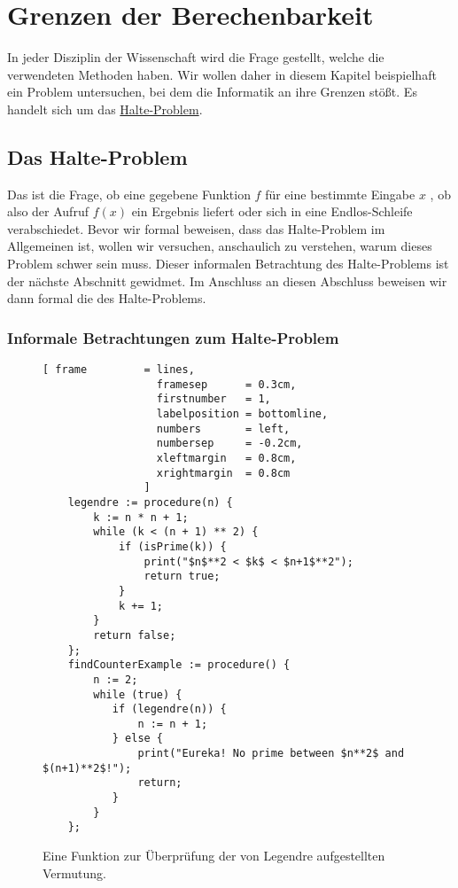 \chapter{Grenzen der Berechenbarkeit}
In jeder Disziplin der Wissenschaft wird die Frage gestellt, welche  die
verwendeten Methoden haben.   Wir wollen daher in diesem Kapitel beispielhaft ein Problem
untersuchen, bei dem die Informatik an ihre Grenzen stößt.  Es handelt sich um das
\href{http://de.wikipedia.org/wiki/Halteproblem}{Halte-Problem}.  

\section{Das Halte-Problem}
Das  ist die Frage, ob eine gegebene Funktion $f$ für eine bestimmte Eingabe $x$ 
, ob also der Aufruf $f(x)$ ein Ergebnis liefert oder sich in eine Endlos-Schleife
verabschiedet.   Bevor wir formal beweisen, dass das Halte-Problem im Allgemeinen  ist, wollen 
wir versuchen, anschaulich zu verstehen, warum dieses Problem schwer sein muss.  Dieser informalen
Betrachtung des Halte-Problems ist der nächste Abschnitt gewidmet.  Im Anschluss an diesen Abschluss
beweisen wir dann formal die  des Halte-Problems. 

\subsection{Informale Betrachtungen zum Halte-Problem}


\begin{figure}[!ht]
\centering
\begin{Verbatim}[ frame         = lines, 
                  framesep      = 0.3cm, 
                  firstnumber   = 1,
                  labelposition = bottomline,
                  numbers       = left,
                  numbersep     = -0.2cm,
                  xleftmargin   = 0.8cm,
                  xrightmargin  = 0.8cm
                ]
    legendre := procedure(n) {
        k := n * n + 1;
        while (k < (n + 1) ** 2) {
            if (isPrime(k)) {
                print("$n$**2 < $k$ < $n+1$**2");
                return true;
            }
            k += 1;
        }
        return false;
    };
    findCounterExample := procedure() {
        n := 2;
        while (true) {
           if (legendre(n)) {
               n := n + 1;
           } else {
               print("Eureka! No prime between $n**2$ and $(n+1)**2$!");
               return;
           }
        }
    };
\end{Verbatim} 
\vspace*{-0.3cm}
\caption{Eine Funktion zur Überprüfung der von Legendre aufgestellten Vermutung.}
\label{fig:legendre.stlx}
\end{figure}

